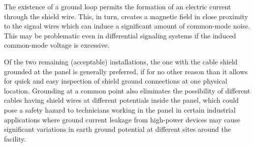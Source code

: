 The existence of a ground loop permits the formation of an electric current through the shield wire.  This, in turn, creates a magnetic field in close proximity to the signal wires which can induce a  significant amount of common-mode noise.  This may be problematic even in differential signaling systems if the induced common-mode voltage is excessive.

\vskip 10pt

Of the two remaining (acceptable) installations, the one with the cable shield grounded at the panel is generally preferred, if for no other reason than it allows for quick and easy inspection of shield ground connections at one physical location.  Grounding at a common point also eliminates the possibility of different cables having shield wires at different potentials inside the panel, which could pose a safety hazard to technicians working in the panel in certain industrial applications where ground current leakage from high-power devices may cause significant variations in earth ground potential at different sites around the facility.





